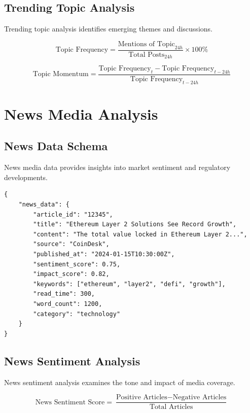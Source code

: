\documentclass[12pt,a4paper]{article}
\begin{document}
\subsection{Trending Topic Analysis}

Trending topic analysis identifies emerging themes and discussions.

\begin{equation}
\text{Topic Frequency} = \frac{\text{Mentions of Topic}_{24h}}{\text{Total Posts}_{24h}} \times 100\%
\end{equation}

\begin{equation}
\text{Topic Momentum} = \frac{\text{Topic Frequency}_{t} - \text{Topic Frequency}_{t-24h}}{\text{Topic Frequency}_{t-24h}}
\end{equation}

\section{News Media Analysis}

\subsection{News Data Schema}

News media data provides insights into market sentiment and regulatory developments.

\begin{lstlisting}
{
    "news_data": {
        "article_id": "12345",
        "title": "Ethereum Layer 2 Solutions See Record Growth",
        "content": "The total value locked in Ethereum Layer 2...",
        "source": "CoinDesk",
        "published_at": "2024-01-15T10:30:00Z",
        "sentiment_score": 0.75,
        "impact_score": 0.82,
        "keywords": ["ethereum", "layer2", "defi", "growth"],
        "read_time": 300,
        "word_count": 1200,
        "category": "technology"
    }
}
\end{lstlisting}

\subsection{News Sentiment Analysis}

News sentiment analysis examines the tone and impact of media coverage.

\begin{equation}
\text{News Sentiment Score} = \frac{\text{Positive Articles} - \text{Negative Articles}}{\text{Total Articles}}
\end{equation}
\end{document}
